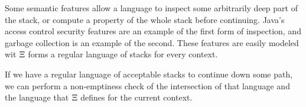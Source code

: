 Some semantic features allow a language to inspect some arbitrarily deep part of the stack, or compute a property of the whole stack before continuing.
Java's access control security features are an example of the first form of inspection, and garbage collection is an example of the second.
These features are easily modeled wit
$\Xi$ forms a regular language of stacks for every context.


 If we have a regular language of acceptable stacks to continue down some path, we can perform a non-emptiness check of the intersection of that language and the language that $\Xi$ defines for the current context.

